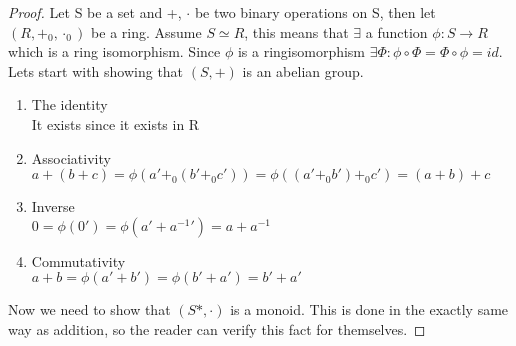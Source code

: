 \documentclass[12pt]{report}
\theoremstyle{definition}
\theoremstyle{remark}
\begin{document}
    \begin{proof}
      Let S be a set and +, $\cdot$ be two binary operations on S, then let $(R,+_0,\cdot_0)$ be a ring. Assume $S\simeq R$, this means that $\exists$ a function $\phi:S\rightarrow R$ which is a ring isomorphism. Since $\phi$ is a ringisomorphism $\exists\Phi: \phi\circ\Phi=\Phi\circ\phi=id$.
      Lets start with showing that $(S,+)$ is an abelian group.
      \begin{enumerate}
        \item The identity\\
              It exists since it exists in R
        \item Associativity\\
              $a+(b+c)=\phi(a'+_0 (b'+_0 c'))=\phi((a'+_0 b') +_0 c')=(a+b)+c$
        \item Inverse\\
              $0=\phi(0')=\phi(a'+{a^{-1}}')=a+a^{-1}$
        \item Commutativity\\
              $a+b=\phi(a'+b')=\phi(b'+a')=b'+a'$
      \end{enumerate}
      Now we need to show that $(S*, \cdot)$ is a monoid. This is done in the
      exactly same way as addition, so the reader can verify this fact for themselves.
    \end{proof}
\end{document}

